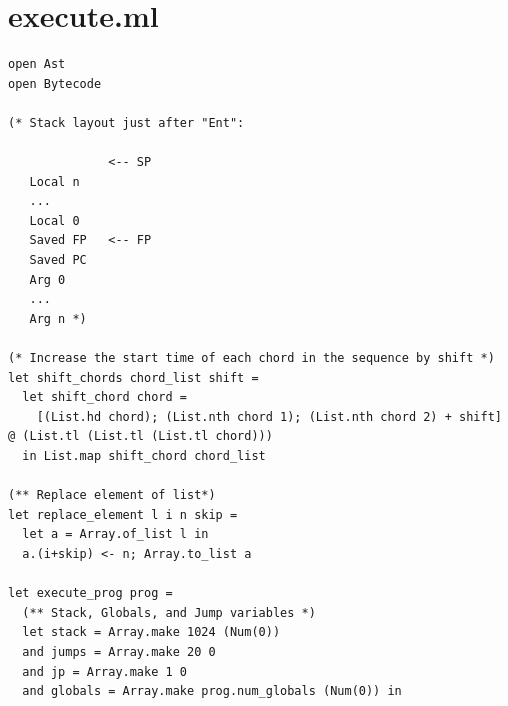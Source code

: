 \documentclass[12pt,A4]{book}
\begin{document}
\section{execute.ml}
\begin{verbatim}
open Ast
open Bytecode

(* Stack layout just after "Ent":

              <-- SP
   Local n
   ...
   Local 0
   Saved FP   <-- FP
   Saved PC
   Arg 0
   ...
   Arg n *)
 
(* Increase the start time of each chord in the sequence by shift *)   
let shift_chords chord_list shift =
  let shift_chord chord =
    [(List.hd chord); (List.nth chord 1); (List.nth chord 2) + shift] @ (List.tl (List.tl (List.tl chord)))
  in List.map shift_chord chord_list
  
(** Replace element of list*)
let replace_element l i n skip = 
  let a = Array.of_list l in
  a.(i+skip) <- n; Array.to_list a

let execute_prog prog =
  (** Stack, Globals, and Jump variables *)
  let stack = Array.make 1024 (Num(0))
  and jumps = Array.make 20 0 
  and jp = Array.make 1 0
  and globals = Array.make prog.num_globals (Num(0)) in


\end{verbatim}
\end{document}
